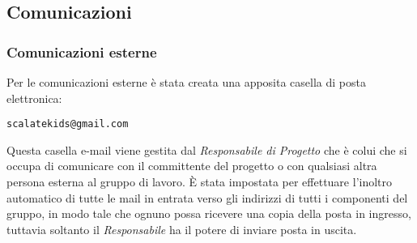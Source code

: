 \documentclass{scalatekids-article}
\begin{document}
\subsection{Comunicazioni}
\subsubsection{Comunicazioni esterne}
Per le comunicazioni esterne è stata creata una apposita casella di posta elettronica:
\begin{center}
  \verb=scalatekids@gmail.com=
\end{center}
Questa casella e-mail viene gestita dal \textit{Responsabile di Progetto} che è
colui che si occupa di comunicare con il committente del progetto o con
qualsiasi altra persona esterna al gruppo di lavoro. È stata impostata per
effettuare l'inoltro automatico di tutte le mail in entrata verso gli indirizzi
di tutti i componenti del gruppo, in modo tale che ognuno possa ricevere una
copia della posta in ingresso, tuttavia soltanto il \textit{Responsabile} ha il
potere di inviare posta in uscita.
\end{document}
